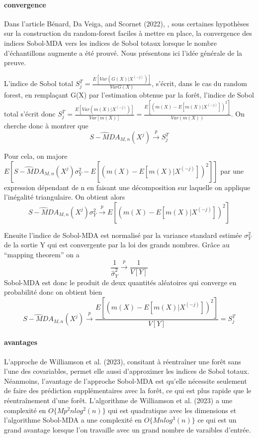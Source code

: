 \documentclass[
]{article}
\begin{document}
\hypertarget{convergence}{%
\paragraph{convergence}\label{convergence}}

Dans l'article Bénard, Da Veiga, and Scornet (2022), , sous certaines
hypothèses sur la construction du random-forest faciles à mettre en
place, la convergence des indices Sobol-MDA vers les indices de Sobol
totaux lorsque le nombre d'échantillons augmente a été prouvé. Nous
présentons ici l'idée générale de la preuve.

L'indice de Sobol total \(S_j^T=\frac{E[Var(G(X)|X^{(-j)})]}{VarG(X)}\),
s'écrit, dans le cas du random forest, en remplaçant G(X) par
l'estimation obtenue par la forêt, l'indice de Sobol total s'écrit donc
\(S_j^T=\frac{E[Var(m(X)|X^{(-j)})]}{Var[m(X)]}=\frac{E[(m(X)-E[m(X)|X^{(-j)}])^2]}{Var(m(X))}\).
On cherche donc à montrer que
\[\widehat{S-MDA}_{M,n}(X^{j})\overset{p}{\longrightarrow}S_j^T\]

Pour cela, on majore
\(E[\widehat{S-MDA}_{M,n}(X^{j})\sigma_Y^2-E[(m(X)-E[m(X)|X^{(-j)}])^2]]\)
par une expression dépendant de n en faisant une décomposition sur
laquelle on applique l'inégalité triangulaire. On obtient alors
\[\widehat{S-MDA}_{M,n}(X^{j})\sigma_Y^2\overset{p}{\longrightarrow}E[(m(X)-E[m(X)|X^{(-j)}])^2]\]

Ensuite l'indice de Sobol-MDA est normalisé par la variance standard
estimée \(\sigma_Y^2\) de la sortie Y qui est convergente par la loi des
grands nombres. Grâce au ``mapping theorem'' on a
\[\frac{1}{\hat\sigma_Y^2}\overset{p}{\longrightarrow}\frac{1}{V[Y]}\]
Sobol-MDA est donc le produit de deux quantités aléatoires qui converge
en probabilité donc on obtient bien
\[\widehat{S-MDA}_{M,n}(X^{j})\overset{p}{\longrightarrow}\frac{E[(m(X)-E[m(X)|X^{(-j)}])^2]}{V[Y]}=S_j^T\]

\hypertarget{avantages}{%
\paragraph{avantages}\label{avantages}}

L'approche de Williamson et al. (2023), consitant à réentraîner une
forêt sans l'une des covariables, permet elle aussi d'approximer les
indices de Sobol totaux. Néanmoins, l'avantage de l'approche Sobol-MDA
est qu'elle nécessite seulement de faire des prédiction supplémentaires
avec la forêt, ce qui est plus rapide que le réentraînement d'une forêt.
L'algorithme de Williamson et al. (2023) a une complexité en
\(O\{Mp^2nlog^2(n)\}\) qui est quadratique avec les dimensions et
l'algorithme Sobol-MDA a une complexité en \(O\{Mnlog^3(n)\}\) ce qui
est un grand avantage lorsque l'on travaille avec un grand nombre de
varaibles d'entrée.
\end{document}

